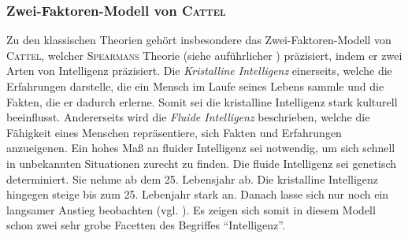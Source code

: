 \documentclass[a4paper, 11pt]{scrartcl}
\begin{document}
\subsubsection{Zwei-Faktoren-Modell von \textsc{Cattel}}
Zu den klassischen Theorien gehört insbesondere das Zwei-Faktoren-Modell von \textsc{Cattel}, welcher \textsc{Spearmans} Theorie (siehe auführlicher \cite{Spektrum2000}) präzisiert, indem er zwei Arten von Intelligenz präzisiert. Die \textit{Kristalline Intelligenz} einerseits, welche die Erfahrungen darstelle, die ein Mensch im Laufe seines Lebens sammle und die Fakten, die er dadurch erlerne. Somit sei die kristalline Intelligenz stark kulturell beeinflusst. Andererseits wird die \textit{Fluide Intelligenz} beschrieben, welche die Fähigkeit eines Menschen repräsentiere, sich Fakten und Erfahrungen anzueigenen. Ein hohes Maß an fluider Intelligenz sei notwendig, um sich schnell in unbekannten Situationen zurecht zu finden. Die fluide Intelligenz sei genetisch determiniert.  Sie nehme ab dem 25. Lebensjahr ab. Die kristalline Intelligenz hingegen steige bis zum 25. Lebenjahr stark an. Danach lasse sich nur noch ein langsamer Anstieg beobachten (vgl. \cite{Dorsch2019}). Es zeigen sich somit in diesem Modell schon zwei sehr grobe Facetten des Begriffes ``Intelligenz''.
\end{document}

